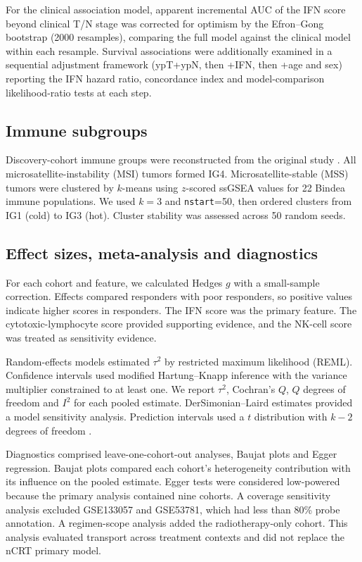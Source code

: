 \documentclass[11pt,a4paper]{article}
\begin{document}
For the clinical association model, apparent incremental AUC of the IFN score beyond clinical T/N stage was corrected for optimism by the Efron--Gong bootstrap (2000 resamples), comparing the full model against the clinical model within each resample. Survival associations were additionally examined in a sequential adjustment framework (ypT+ypN, then +IFN, then +age and sex) reporting the IFN hazard ratio, concordance index and model-comparison likelihood-ratio tests at each step.

\subsection{Immune subgroups}

Discovery-cohort immune groups were reconstructed from the original study \cite{Chatila}. All microsatellite-instability (MSI) tumors formed IG4. Microsatellite-stable (MSS) tumors were clustered by $k$-means using $z$-scored ssGSEA values for 22 Bindea immune populations. We used $k=3$ and \texttt{nstart}=50, then ordered clusters from IG1 (cold) to IG3 (hot). Cluster stability was assessed across 50 random seeds.

\subsection{Effect sizes, meta-analysis and diagnostics}

For each cohort and feature, we calculated Hedges $g$ with a small-sample correction. Effects compared responders with poor responders, so positive values indicate higher scores in responders. The IFN score was the primary feature. The cytotoxic-lymphocyte score provided supporting evidence, and the NK-cell score was treated as sensitivity evidence.

Random-effects models estimated $\tau^2$ by restricted maximum likelihood (REML). Confidence intervals used modified Hartung--Knapp inference with the variance multiplier constrained to at least one. We report $\tau^2$, Cochran's $Q$, $Q$ degrees of freedom and $I^2$ for each pooled estimate. DerSimonian--Laird estimates provided a model sensitivity analysis. Prediction intervals used a $t$ distribution with $k-2$ degrees of freedom \cite{IntHout}.

Diagnostics comprised leave-one-cohort-out analyses, Baujat plots and Egger regression. Baujat plots compared each cohort's heterogeneity contribution with its influence on the pooled estimate. Egger tests were considered low-powered because the primary analysis contained nine cohorts. A coverage sensitivity analysis excluded GSE133057 and GSE53781, which had less than 80\% probe annotation. A regimen-scope analysis added the radiotherapy-only cohort. This analysis evaluated transport across treatment contexts and did not replace the nCRT primary model.
\end{document}
